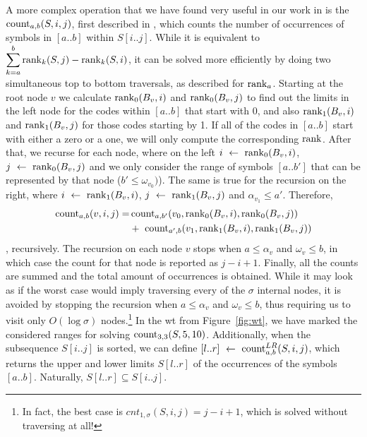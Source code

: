\documentclass[a4paper,10pt,twoside]{book}
\begin{document}
    A more complex operation that we have found very useful in our work in is the $\operatorname{count}_{a,b}(S,i,j)$, first described in \cite{gagie2012new}, which counts the number of occurrences of symbols in $[a..b]$ within $S[i..j]$. While it is equivalent to $\displaystyle\sum^b_{k=a}\operatorname{rank}_k(S,j) - \operatorname{rank}_k(S,i)$, it can be solved more efficiently by doing two simultaneous top to bottom traversals, as described for $\operatorname{rank}_a$. Starting at the root node $v$ we calculate $\operatorname{rank}_0(B_v,i)$ and $\operatorname{rank}_0(B_v,j)$ to find out the limits in the left node for the codes within $[a..b]$ that start with 0, and also $\operatorname{rank}_1(B_v,i)$ and $\operatorname{rank}_1(B_v,j)$ for those codes starting by 1. If all of the codes in $[a..b]$ start with either a zero or a one, we will only compute the corresponding $\operatorname{rank}$. After that, we recurse for each node, where on the left $i~\leftarrow~\operatorname{rank}_0(B_v,i)$, $j~\leftarrow~\operatorname{rank}_0(B_v,j)$ and we only consider the range of symbols $[a..b']$ that can be represented by that node ($b' \leq \omega_{v_0})$). The same is true for the recursion on the right, where $i~\leftarrow~\operatorname{rank}_1(B_v,i)$, $j~\leftarrow~\operatorname{rank}_1(B_v,j)$ and $\alpha_{v_1} \leq a'$. Therefore, 
    \begin{align*}
    \operatorname{count}_{a,b}(v,i,j) = &\operatorname{count}_{a,b'}(v_0,\operatorname{rank}_0(B_v,i),\operatorname{rank}_0(B_v,j))\\
    &+~\operatorname{count}_{a',b}(v_1,\operatorname{rank}_1(B_v,i),\operatorname{rank}_1(B_v,j))
    \end{align*}
    , recursively. The recursion on each node $v$ stops when $a \leq \alpha_v$ and $\omega_v \leq b$, in which case the count for that node is reported as $j-i+1$. Finally, all the counts are summed and the total amount of occurrences is obtained. While it may look as if the worst case would imply traversing every of the $\sigma$ internal nodes, it is avoided by stopping the recursion when $a \leq \alpha_v$ and $\omega_v \leq b$, thus requiring us to visit only $O(\log\sigma)$ nodes.\footnote{In fact, the best case is $cnt_{1,\sigma}(S,i,j) = j-i+1$, which is solved without traversing at all!} In the \gls{wt} from Figure~\ref{fig:wt}, we have marked the considered ranges for solving $\operatorname{count}_{3,3}(S,5,10)$. Additionally, when the subsequence $S[i..j]$ is sorted, we can define $[l..r]~\leftarrow~\operatorname{count}^{LR}_{a,b}(S,i,j)$, which returns the upper and lower limits $S[l..r]$ of the occurrences of the symbols $[a..b]$. Naturally, $S[l..r] \subseteq S[i..j]$.
    
\end{document}
